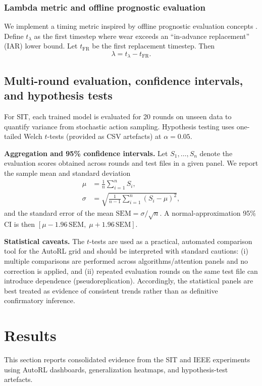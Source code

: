 \documentclass[sn-basic]{sn-jnl} %
\begin{document}
\subsubsection{Lambda metric and offline prognostic evaluation}
We implement a timing metric inspired by offline prognostic evaluation concepts \cite{Saxena2010Metrics}. Define $t_{\lambda}$ as the first timestep where wear exceeds an ``in-advance replacement'' (IAR) lower bound. Let $t_{\mathrm{FR}}$ be the first replacement timestep. Then
\begin{equation}
        \lambda = t_{\lambda} - t_{\mathrm{FR}}.
\end{equation}

\subsection{Multi-round evaluation, confidence intervals, and hypothesis tests}
For SIT, each trained model is evaluated for 20 rounds on unseen data to quantify variance from stochastic action sampling. Hypothesis testing uses one-tailed Welch $t$-tests (provided as CSV artefacts) at $\alpha=0.05$.

\textbf{Aggregation and 95\% confidence intervals.}
Let $S_1,\ldots,S_n$ denote the evaluation scores obtained across rounds and test files in a given panel. We report the sample mean and standard deviation
\begin{align}
\mu &= \frac{1}{n}\sum_{i=1}^{n} S_i,\\
\sigma &= \sqrt{\frac{1}{n-1}\sum_{i=1}^{n}(S_i-\mu)^2},
\end{align}
and the standard error of the mean $\mathrm{SEM}=\sigma/\sqrt{n}$. A normal-approximation 95\% CI is then $[\mu-1.96\,\mathrm{SEM},\;\mu+1.96\,\mathrm{SEM}]$.

\textbf{Statistical caveats.}
The $t$-tests are used as a practical, automated comparison tool for the AutoRL grid and should be interpreted with standard cautions: (i) multiple comparisons are performed across algorithms/attention panels and no correction is applied, and (ii) repeated evaluation rounds on the same test file can introduce dependence (pseudoreplication). Accordingly, the statistical panels are best treated as evidence of consistent trends rather than as definitive confirmatory inference.

\section{Results}
\label{sec:results}
This section reports consolidated evidence from the SIT and IEEE experiments using AutoRL dashboards, generalization heatmaps, and hypothesis-test artefacts.
\end{document}
